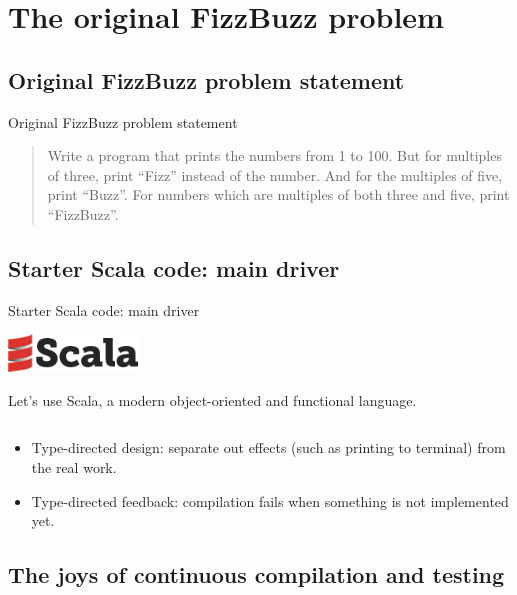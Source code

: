 \section{The original FizzBuzz problem}

\subsection{Original FizzBuzz problem statement}

\begin{frame}{Original FizzBuzz problem statement}
  \begin{quotation}
Write a program that prints the numbers from 1 to 100. But for multiples of three, print ``Fizz'' instead of the number. And for the multiples of five, print ``Buzz''. For numbers which are multiples of both three and five, print ``FizzBuzz''.
  \end{quotation}
\end{frame}

\subsection{Starter Scala code: main driver}

\begin{frame}[fragile]{Starter Scala code: main driver}
  \begin{center}
    \includegraphics[height=1cm]{scala-logo-red-dark.png}
  \end{center}

  Let's use Scala, a modern \alert{object-oriented} and \alert{functional} language.

  \inputminted{scala}{Main1.scala}

  \begin{itemize}
  \item Type-directed design: separate out effects (such as printing to terminal) from the real work.
  \item Type-directed feedback: compilation fails when something is not implemented yet.
  \end{itemize}
\end{frame}

\subsection{The joys of continuous compilation and testing}

